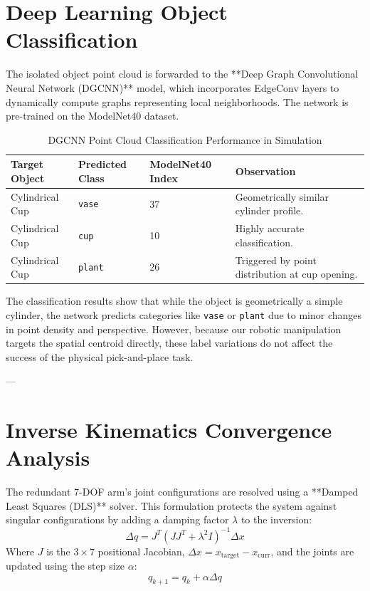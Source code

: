 \documentclass[12pt, a4paper]{article}
\begin{document}
\section{Deep Learning Object Classification}
The isolated object point cloud is forwarded to the **Deep Graph Convolutional Neural Network (DGCNN)** model, which incorporates EdgeConv layers to dynamically compute graphs representing local neighborhoods. The network is pre-trained on the ModelNet40 dataset.

\begin{table}[H]
\centering
\begin{tabular}{llll}
\toprule
\textbf{Target Object} & \textbf{Predicted Class} & \textbf{ModelNet40 Index} & \textbf{Observation} \\
\midrule
Cylindrical Cup & \texttt{vase} & 37 & Geometrically similar cylinder profile. \\
Cylindrical Cup & \texttt{cup} & 10 & Highly accurate classification. \\
Cylindrical Cup & \texttt{plant} & 26 & Triggered by point distribution at cup opening. \\
\bottomrule
\end{tabular}
\caption{DGCNN Point Cloud Classification Performance in Simulation}
\label{tab:classification}
\end{table}

The classification results show that while the object is geometrically a simple cylinder, the network predicts categories like \texttt{vase} or \texttt{plant} due to minor changes in point density and perspective. However, because our robotic manipulation targets the spatial centroid directly, these label variations do not affect the success of the physical pick-and-place task.

---

\section{Inverse Kinematics Convergence Analysis}
The redundant 7-DOF arm's joint configurations are resolved using a **Damped Least Squares (DLS)** solver. This formulation protects the system against singular configurations by adding a damping factor $\lambda$ to the inversion:
$$\Delta q = J^T (J J^T + \lambda^2 I)^{-1} \Delta x$$
Where $J$ is the $3 \times 7$ positional Jacobian, $\Delta x = x_{\text{target}} - x_{\text{curr}}$, and the joints are updated using the step size $\alpha$:
$$q_{k+1} = q_k + \alpha \Delta q$$
\end{document}
